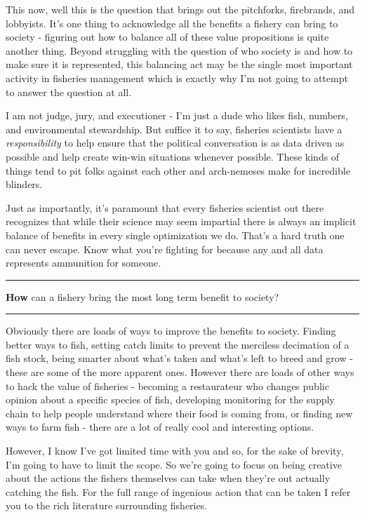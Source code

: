 \documentclass[11pt,a5paper]{book}
\begin{document}
This now, well this is the question that brings out the pitchforks, firebrands, and lobbyists. It's one thing to acknowledge all the benefits a fishery can bring to society - figuring out how to balance all of these value propositions is quite another thing. Beyond struggling with the question of who society is and how to make sure it is represented, this balancing act may be the single most important activity in fisheries management which is exactly why I'm not going to attempt to answer the question at all. 
\newline

I am not judge, jury, and executioner - I'm just a dude who likes fish, numbers, and environmental stewardship. But suffice it to say, fisheries scientists have a \textit{responsibility} to help ensure that the political conversation is as data driven as possible and help create win-win situations whenever possible. These kinds of things tend to pit folks against each other and arch-nemeses make for incredible blinders.
\newline

Just as importantly, it's paramount that every fisheries scientist out there recognizes that while their science may seem impartial there is always an implicit balance of benefits in every single optimization we do. That's a hard truth one can never escape. Know what you're fighting for because any and all data represents ammunition for someone. 
\newpage

\noindent \rule{\textwidth}{0.5pt} 
\noindent \textbf{How} can a fishery bring the most long term benefit to society?
\newline
\rule{\textwidth}{0.5pt} 
\vspace{5pt}

Obviously there are loads of ways to improve the benefits to society. Finding better ways to fish, setting catch limits to prevent the merciless decimation of a fish stock, being smarter about what's taken and what's left to breed and grow - these are some of the more apparent ones. However there are loads of other ways to hack the value of fisheries - becoming a restaurateur who changes public opinion about a specific species of fish, developing monitoring for the supply chain to help people understand where their food is coming from, or finding new ways to farm fish - there are a lot of really cool and interesting options. 
\newline

However, I know I've got limited time with you and so, for the sake of brevity, I'm going to have to limit the scope. So we're going to focus on being creative about the actions the fishers themselves can take when they're out actually catching the fish. For the full range of ingenious action that can be taken I refer you to the rich literature surrounding fisheries. 
\newpage
\end{document}
